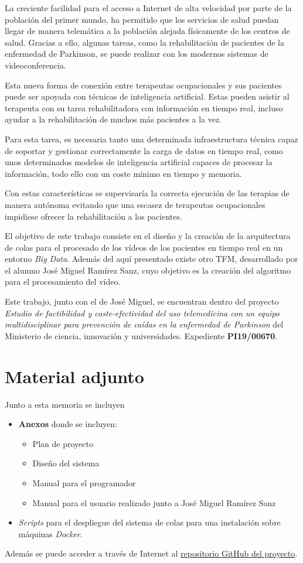 
La creciente facilidad para el acceso a Internet de alta velocidad por parte de la población del primer mundo, ha permitido que los servicios de salud puedan llegar de manera telemática a la población alejada físicamente de los centros de salud. Gracias a ello,  algunas tareas, como la rehabilitación de pacientes de la enfermedad de Parkinson, se puede realizar con los modernos sistemas de videoconferencia.

Esta nueva forma de conexión entre terapeutas ocupacionales y sus pacientes puede ser apoyada con técnicas de inteligencia artificial. Estas pueden asistir al terapeuta con su tarea rehabilitadora con información en tiempo real, incluso ayudar a la rehabilitación de muchos más pacientes a la vez. 

Para esta tarea, es necesaria tanto una determinada infraestructura técnica capaz de soportar y gestionar correctamente la carga de datos en tiempo real, como unos determinados modelos de inteligencia artificial capaces de procesar la información, todo ello con un coste mínimo en tiempo y memoria.

Con estas características se supervisaría la correcta ejecución de las terapias de manera autónoma evitando que una escasez de terapeutas ocupacionales impidiese ofrecer la rehabilitación a los pacientes. 

El objetivo de este trabajo consiste en el diseño y la creación de la arquitectura de colas para el procesado de los vídeos de los pacientes en tiempo real en un entorno \textit{Big Data}. Además del aquí presentado existe otro TFM, desarrollado por el alumno José Miguel Ramírez Sanz, cuyo objetivo es la creación del algoritmo para el procesamiento del vídeo. 

Este trabajo, junto con el de José Miguel, se encuentran dentro del proyecto \textit{Estudio de factibilidad y coste-efectividad del uso telemedicina con un equipo multidisciplinar para prevención de caídas en la enfermedad de Parkinson} del Ministerio de ciencia, innovación y universidades. Expediente \textbf{PI19/00670}. 

\section{Material adjunto}

Junto a esta memoria se incluyen

\begin{itemize}
	\item \textbf{Anexos} donde se incluyen:
	\begin{itemize}
		\item Plan de proyecto
		\item Diseño del sistema
		\item Manual para el programador
		\item Manual para el usuario realizado junto a José Miguel Ramírez Sanz
	\end{itemize}
	\item \textit{Scripts} para el despliegue del sistema de colas para una instalación sobre máquinas \textit{Docker}.
\end{itemize}

Además se puede acceder a través de Internet al \href{https://github.com/jlgarridol/TFM-IF-FIS}{repositorio GitHub del proyecto}.